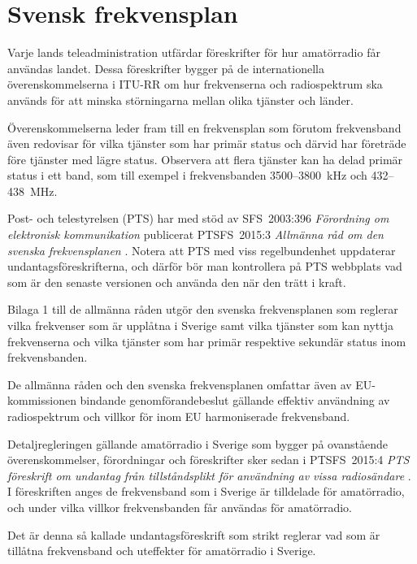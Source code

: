 \chapter{Svensk frekvensplan}
\label{svensk frekvensplan}

Varje lands teleadministration utfärdar föreskrifter för hur amatörradio får
användas landet.
Dessa föreskrifter bygger på de internationella överenskommelserna i ITU-RR
\cite[ARTICLE 5]{ITU-RR} om hur frekvenserna och radiospektrum ska används för
att minska störningarna mellan olika tjänster och länder.

Överenskommelserna leder fram till en frekvensplan som förutom frekvensband även
redovisar för vilka tjänster som har primär status och därvid har företräde före
tjänster med lägre status.
Observera att flera tjänster kan ha delad primär status i ett band, som till
exempel i frekvensbanden 3500--3800~kHz och 432--438~MHz.

Post- och telestyrelsen (PTS) har med stöd av SFS~2003:396
\emph{Förordning om elektronisk kommunikation} \cite{SFS2003:396}
publicerat PTSFS~2015:3 \emph{Allmänna råd om den svenska frekvensplanen}
\cite{PTSFS2015:3}.
Notera att PTS med viss regelbundenhet uppdaterar undantagsföreskrifterna,
och därför bör man kontrollera på PTS webbplats vad som är den senaste versionen
och använda den när den trätt i kraft.

Bilaga 1 till de allmänna råden utgör den svenska frekvensplanen som reglerar
vilka frekvenser som är upplåtna i Sverige samt vilka tjänster som kan nyttja
frekvenserna och vilka tjänster som har primär respektive sekundär status inom
frekvensbanden.

De allmänna råden och den svenska frekvensplanen omfattar även av
EU-kommissionen bindande genomförandebeslut gällande effektiv användning av
radiospektrum och villkor för inom EU harmoniserade frekvensband.

Detaljregleringen gällande amatörradio i Sverige som bygger på ovanstående
överenskommelser, förordningar och föreskrifter sker sedan i PTSFS~2015:4
\emph{PTS föreskrift om undantag från tillståndsplikt för användning av vissa
  radiosändare} \cite{PTSFS2015:4}.
I föreskriften anges de frekvensband som i Sverige är tilldelade för
amatörradio, och under vilka villkor frekvensbanden får användas för
amatörradio.

Det är denna så kallade undantagsföreskrift som strikt reglerar vad som är
tillåtna frekvensband och uteffekter för amatörradio i Sverige.

